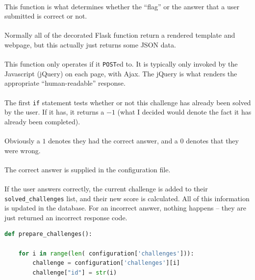 \documentclass[11pt]{article}
\begin{document}
	\paragraph{} This function is what determines whether the ``flag'' or the answer that a user submitted is correct or not.

	\paragraph{} Normally all of the decorated Flask function return a rendered template and webpage, but this actually just returns some JSON data.

	\paragraph{} This function only operates if it \texttt{POST}ed to. It is typically only invoked by the Javascript (jQuery) on each page, with Ajax. The jQuery is what renders the appropriate ``human-readable'' response. 

	\paragraph{} The first \texttt{if} statement tests whether or not this challenge has already been solved by the user. If it has, it returns a $-1$ (what I decided would denote the fact it has already been completed).

	\paragraph{} Obviously a $1$ denotes they had the correct answer, and a $0$ denotes that they were wrong.

	\paragraph{} The correct answer is supplied in the configuration file. 

	\paragraph{} If the user answers correctly, the current challenge is added to their \texttt{solved\_challenges} list, and their new score is calculated. All of this information is updated in the database. For an incorrect answer, nothing happens -- they are just returned an incorrect response code.

	\begin{lstlisting}[language=Python]
def prepare_challenges():

	for i in range(len( configuration['challenges'])):
		challenge = configuration['challenges'][i]
		challenge["id"] = str(i)
\end{lstlisting}
\end{document}
